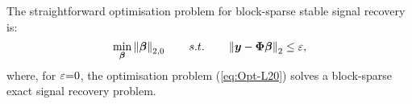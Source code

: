 The straightforward optimisation problem for block-sparse stable signal recovery is:
\begin{equation}
\label{eq:Opt-L20} 
\min_{\boldsymbol{\beta}} \left\lVert\boldsymbol{\beta}\right\rVert_{2,0} \qquad s.t. \qquad \left\lVert\boldsymbol{y} - \boldsymbol{\Phi} \boldsymbol{\beta}\right\rVert_2 \leq \varepsilon,
\end{equation}
where, for $\varepsilon {=} 0$, the optimisation problem (\ref{eq:Opt-L20}) solves a block-sparse exact signal recovery problem.